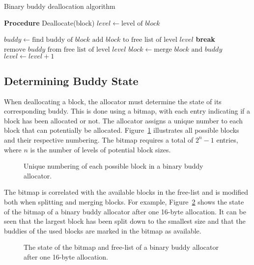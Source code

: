 \begin{algorithm}[h]
    \caption{Binary buddy deallocation algorithm}
    \label{alg:bbuddy_dealloc}
    \begin{algorithmic}[1]
        \Statex \textbf{Procedure} Deallocate(block)
        \State $level \gets \text{level of } block$

        \State $buddy \gets \text{find buddy of } block$
        \State $\text{add } block \text{ to free list of level } level$
        \State \textbf{break}
        \Else
        \State $\text{remove } buddy \text{ from free list of level } level$
        \State $block \gets \text{merge } block \text{ and } buddy$
        \State $level \gets level + 1$
        \EndIf
        \EndWhile
    \end{algorithmic}
\end{algorithm}

\FloatBarrier
\subsection{Determining Buddy State}
When deallocating a block, the allocator must determine the state of its corresponding buddy. This is done using a bitmap, with each entry indicating if a block has been allocated or not. The allocator assigns a unique number to each block that can potentially be allocated. Figure~\ref{fig:buddyorder} illustrates all possible blocks and their respective numbering. The bitmap requires a total of $2^n - 1$ entries, where $n$ is the number of levels of potential block sizes.

\begin{figure}[h]
    \centering
    
    \caption{Unique numbering of each possible block in a binary buddy allocator.}
    \label{fig:buddyorder}
\end{figure}
The bitmap is correlated with the available blocks in the free-list and is modified both when splitting and merging blocks. For example, Figure~\ref{fig:buddybmapallocated} shows the state of the bitmap of a binary buddy allocator after one 16-byte allocation. It can be seen that the largest block has been split down to the smallest size and that the buddies of the used blocks are marked in the bitmap as available.

\begin{figure}[h]
    \centering
    
    \caption{The state of the bitmap and free-list of a binary buddy allocator after one 16-byte allocation.}
    \label{fig:buddybmapallocated}
\end{figure}

